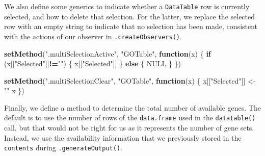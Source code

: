\documentclass[
]{book}
\newenvironment{Shaded}{\begin{snugshade}}{\end{snugshade}}
\newcommand{\ControlFlowTok}[1]{\textcolor[rgb]{0.13,0.29,0.53}{\textbf{#1}}}
\newcommand{\KeywordTok}[1]{\textcolor[rgb]{0.13,0.29,0.53}{\textbf{#1}}}
\newcommand{\NormalTok}[1]{#1}
\newcommand{\OperatorTok}[1]{\textcolor[rgb]{0.81,0.36,0.00}{\textbf{#1}}}
\newcommand{\OtherTok}[1]{\textcolor[rgb]{0.56,0.35,0.01}{#1}}
\newcommand{\StringTok}[1]{\textcolor[rgb]{0.31,0.60,0.02}{#1}}
\begin{document}
\begin{Shaded}
\end{Shaded}

We also define some generics to indicate whether a \texttt{DataTable} row is currently selected, and how to delete that selection.
For the latter, we replace the selected row with an empty string to indicate that no selection has been made,
consistent with the actions of our observer in \texttt{.createObservers()}.

\begin{Shaded}
\begin{Highlighting}[]
\KeywordTok{setMethod}\NormalTok{(}\StringTok{".multiSelectionActive"}\NormalTok{, }\StringTok{"GOTable"}\NormalTok{, }\ControlFlowTok{function}\NormalTok{(x) \{}
    \ControlFlowTok{if}\NormalTok{ (x[[}\StringTok{"Selected"}\NormalTok{]]}\OperatorTok{!=}\StringTok{""}\NormalTok{) \{}
\NormalTok{        x[[}\StringTok{"Selected"}\NormalTok{]]}
\NormalTok{    \} }\ControlFlowTok{else}\NormalTok{ \{}
        \OtherTok{NULL}
\NormalTok{    \}}
\NormalTok{\})}

\KeywordTok{setMethod}\NormalTok{(}\StringTok{".multiSelectionClear"}\NormalTok{, }\StringTok{"GOTable"}\NormalTok{, }\ControlFlowTok{function}\NormalTok{(x) \{}
\NormalTok{    x[[}\StringTok{"Selected"}\NormalTok{]] <-}\StringTok{ ""}
\NormalTok{    x}
\NormalTok{\})}
\end{Highlighting}
\end{Shaded}

Finally, we define a method to determine the total number of available genes.
The default is to use the number of rows of the \texttt{data.frame} used in the \texttt{datatable()} call,
but that would not be right for us as it represents the number of gene sets.
Instead, we use the availability information that we previously stored in the \texttt{contents} during \texttt{.generateOutput()}.
\end{document}

